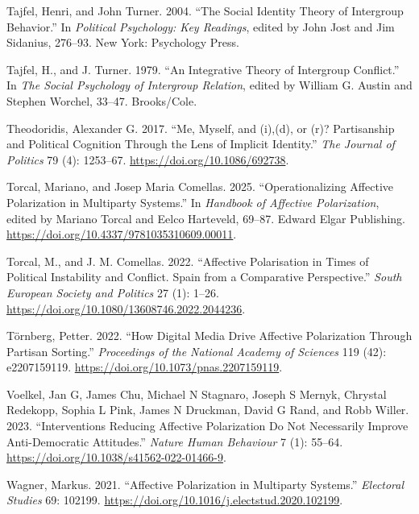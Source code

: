 \documentclass[
  12pt,
  a4paper,
  DIV=11,
  numbers=noendperiod]{scrartcl}
\newlength{\cslhangindent}
\newenvironment{CSLReferences}[2] %
 {\begin{list}{}{%
  \setlength{\itemindent}{0pt}
  \setlength{\leftmargin}{0pt}
  \setlength{\parsep}{0pt}
  \ifodd #1
   \setlength{\leftmargin}{\cslhangindent}
   \setlength{\itemindent}{-1\cslhangindent}
  \fi
  \setlength{\itemsep}{#2\baselineskip}}}
 {\end{list}}
\begin{document}
\begin{CSLReferences}{1}{0}
Tajfel, Henri, and John Turner. 2004. {``The Social Identity Theory of
Intergroup Behavior.''} In \emph{Political Psychology: Key Readings},
edited by John Jost and Jim Sidanius, 276--93. New York: Psychology
Press.

Tajfel, H., and J. Turner. 1979. {``An Integrative Theory of Intergroup
Conflict.''} In \emph{The Social Psychology of Intergroup Relation},
edited by William G. Austin and Stephen Worchel, 33--47. Brooks/Cole.

Theodoridis, Alexander G. 2017. {``Me, Myself, and (i),(d), or (r)?
Partisanship and Political Cognition Through the Lens of Implicit
Identity.''} \emph{The Journal of Politics} 79 (4): 1253--67.
\url{https://doi.org/10.1086/692738}.

Torcal, Mariano, and Josep Maria Comellas. 2025. {``Operationalizing
Affective Polarization in Multiparty Systems.''} In \emph{Handbook of
Affective Polarization}, edited by Mariano Torcal and Eelco Harteveld,
69--87. Edward Elgar Publishing.
\url{https://doi.org/10.4337/9781035310609.00011}.

Torcal, M., and J. M. Comellas. 2022. {``{Affective Polarisation in
Times of Political Instability and Conflict. Spain from a Comparative
Perspective}.''} \emph{South European Society and Politics} 27 (1):
1--26. \url{https://doi.org/10.1080/13608746.2022.2044236}.

Törnberg, Petter. 2022. {``How Digital Media Drive Affective
Polarization Through Partisan Sorting.''} \emph{Proceedings of the
National Academy of Sciences} 119 (42): e2207159119.
\url{https://doi.org/10.1073/pnas.2207159119}.

Voelkel, Jan G, James Chu, Michael N Stagnaro, Joseph S Mernyk, Chrystal
Redekopp, Sophia L Pink, James N Druckman, David G Rand, and Robb
Willer. 2023. {``Interventions Reducing Affective Polarization Do Not
Necessarily Improve Anti-Democratic Attitudes.''} \emph{Nature Human
Behaviour} 7 (1): 55--64.
\url{https://doi.org/10.1038/s41562-022-01466-9}.

Wagner, Markus. 2021. {``Affective Polarization in Multiparty
Systems.''} \emph{Electoral Studies} 69: 102199.
\url{https://doi.org/10.1016/j.electstud.2020.102199}.


\end{CSLReferences}
\end{document}
